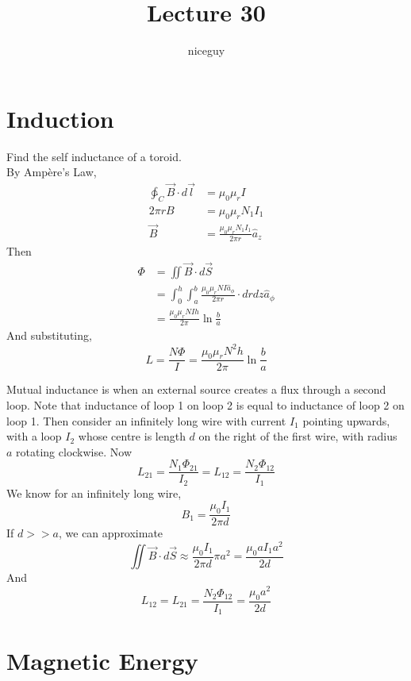 \documentclass[12pt]{article}
\author{niceguy}
\title{Lecture 30}
\begin{document}
\maketitle

\section{Induction}

\begin{ex}
    Find the self inductance of a toroid. \\
    By Amp\`ere's Law,
    \begin{align*}
        \ointctrclockwise_C \vec B \cdot d\vec l &= \mu_0\mu_r I \\
        2\pi r B &= \mu_0\mu_r N_1I_1 \\
        \vec B &= \frac{\mu_0\mu_r N_1I_1}{2\pi r} \hat a_z
    \end{align*}
    Then
    \begin{align*}
        \Phi &= \iint \vec B \cdot d\vec S \\
             &= \int_0^h \int_a^b \frac{\mu_0\mu_rNI\hat a_\phi}{2\pi r} \cdot drdz \hat a_\phi \\
             &= \frac{\mu_0\mu_r NIh}{2\pi} \ln\frac{b}{a}
    \end{align*}
    And substituting,
    $$L = \frac{N\Phi}{I} = \frac{\mu_0\mu_r N^2h}{2\pi} \ln \frac{b}{a}$$
\end{ex}

\begin{ex}
    Mutual inductance is when an external source creates a flux through a second loop. Note that inductance of loop 1 on loop 2 is equal to inductance of loop 2 on loop 1. Then consider an infinitely long wire with current $I_1$ pointing upwards, with a loop $I_2$ whose centre is length $d$ on the right of the first wire, with radius $a$ rotating clockwise. Now
    $$L_{21} = \frac{N_1\Phi_{21}}{I_2} = L_{12} = \frac{N_2\Phi_{12}}{I_1}$$
    We know for an infinitely long wire,
    $$B_1 = \frac{\mu_0I_1}{2\pi d}$$
    If $d>>a$, we can approximate
    $$\iint \vec B \cdot d \vec S \approx \frac{\mu_0I_1}{2\pi d} \pi a^2 = \frac{\mu_0aI_1a^2}{2d}$$
    And
    $$L_{12} = L_{21} = \frac{N_2\Phi_{12}}{I_1} = \frac{\mu_0a^2}{2d}$$
\end{ex}

\section{Magnetic Energy}
\end{document}
